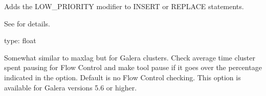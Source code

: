 \documentclass[letterpaper,10pt,english]{sphinxmanual}
\begin{document}
\begin{fulllineitems}
\label{\detokenize{mariadb-archiver:cmdoption-mariadb-archiver-low-priority-insert}}
\sphinxAtStartPar
Adds the LOW\_PRIORITY modifier to INSERT or REPLACE statements.

\sphinxAtStartPar
See  for details.

\end{fulllineitems}


\begin{fulllineitems}
\label{\detokenize{mariadb-archiver:cmdoption-mariadb-archiver-max-flow-ctl}}
\sphinxAtStartPar
type: float

\sphinxAtStartPar
Somewhat similar to \textendash{}max\sphinxhyphen{}lag but for Galera clusters.
Check average time cluster spent pausing for Flow Control and make tool pause if
it goes over the percentage indicated in the option.
Default is no Flow Control checking.
This option is available for Galera versions 5.6 or higher.

\end{fulllineitems}

\end{document}
